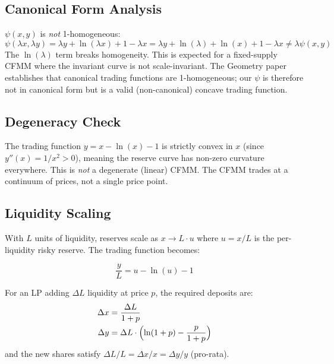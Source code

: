 \subsection{Canonical Form Analysis}

\begin{remark}\label{rem:non-homogeneous}
$\psi(x,y)$ is \emph{not} 1-homogeneous:
\[
  \psi(\lambda x, \lambda y)
  = \lambda y + \ln(\lambda x) + 1 - \lambda x
  = \lambda y + \ln(\lambda) + \ln(x) + 1 - \lambda x
  \neq \lambda \psi(x, y)
\]
The $\ln(\lambda)$ term breaks homogeneity. This is expected for a fixed-supply CFMM
where the invariant curve is not scale-invariant. The Geometry paper
\cite{angeris2023geometry} establishes that canonical trading functions are
1-homogeneous; our $\psi$ is therefore not in canonical form but is a valid
(non-canonical) concave trading function.
\end{remark}

\subsection{Degeneracy Check}

\begin{remark}\label{rem:non-degenerate}
The trading function $y = x - \ln(x) - 1$ is strictly convex in $x$
(since $y''(x) = 1/x^2 > 0$), meaning the reserve curve has non-zero curvature
everywhere. This is \emph{not} a degenerate (linear) CFMM.
The CFMM trades at a continuum of prices, not a single price point.
\end{remark}

\subsection{Liquidity Scaling}\label{subsec:liquidity-scaling}

With $L$ units of liquidity, reserves scale as $x \to L \cdot u$ where $u = x/L$
is the per-liquidity risky reserve. The trading function becomes:

\begin{equation}\label{eq:scaled-invariant}
  \frac{y}{L} = u - \ln(u) - 1
\end{equation}

\begin{proposition}\label{prop:pro-rata}
For an LP adding $\Delta L$ liquidity at price $p$, the required deposits are:
\begin{align}
  \Delta x &= \frac{\Delta L}{1 + p} \label{eq:mint-x}\\
  \Delta y &= \Delta L \cdot \Bigl(\ln(1+p) - \frac{p}{1+p}\Bigr) \label{eq:mint-y}
\end{align}
and the new shares satisfy $\Delta L / L = \Delta x / x = \Delta y / y$ (pro-rata).
\end{proposition}

